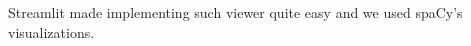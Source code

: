 Streamlit made implementing such viewer quite easy and we used spaCy’s  visualizations. 












